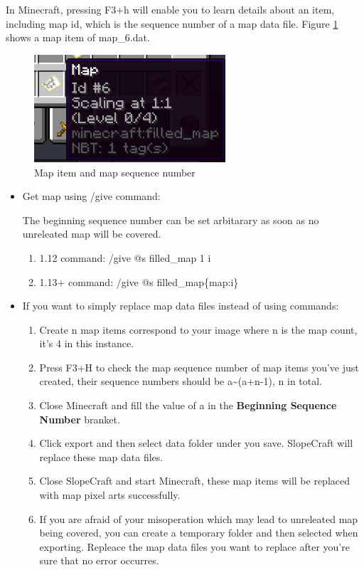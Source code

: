 \documentclass{article}
\begin{document}
In Minecraft, pressing F3+h will enable you to learn details about an item, including map id, which is the sequence number of a map data file. Figure \ref*{mapItem} shows a map item of map\_6.dat.
\begin{figure}[htbp]
    \centering
    \includegraphics[height=4cm]{Img8_MapItem.png}
    \caption{Map item and map sequence number}
    \label{mapItem}
\end{figure}

\begin{itemize}
    \item Get map using /give command:

          The beginning sequence number can be set arbitarary as soon as no unreleated map will be covered.
          \begin{enumerate}
              \item 1.12 command: /give @s filled\_map 1 i
              \item 1.13+ command: /give @s filled\_map\{map:i\}
          \end{enumerate}
    \item If you want to simply replace map data files instead of using commands:
          \begin{enumerate}
              \item Create n map items correspond to your image where n is the map count, it's 4 in this instance.
              \item Press F3+H to check the map sequence number of map items you've just created, their sequence numbers should be a\textasciitilde(a+n-1), n in total.
              \item Close Minecraft and fill the value of a in the \textbf{Beginning Sequence Number} branket.
              \item Click export and then select data folder under you save. SlopeCraft will replace these map data files.
              \item Close SlopeCraft and start Minecraft, these map items will be replaced with map pixel arts successfully.
              \item If you are afraid of your misoperation which may lead to unreleated map being covered, you can create a temporary folder and then selected when exporting. Repleace the map data files you want to replace after you're sure that no error occurres.
          \end{enumerate}
\end{itemize}
\end{document}
